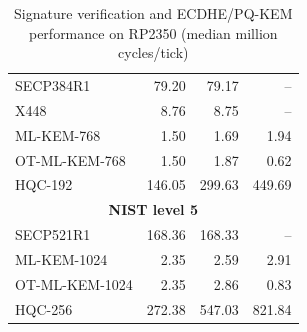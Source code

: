 \documentclass[letterpaper,12pt,titlepage,oneside,final]{book}
\begin{document}
\begin{table}[ht]
\begin{tabular}[t]{lrrr}
    \midrule
        SECP384R1 & 79.20 & 79.17 & -- \\
        X448 & 8.76 & 8.75 & -- \\
        ML-KEM-768 & 1.50 & 1.69 & 1.94 \\
        OT-ML-KEM-768 & 1.50 & 1.87 & 0.62 \\
        HQC-192 & 146.05 & 299.63 & 449.69 \\
    \midrule
        \multicolumn{4}{c}{\bf NIST level 5} \\
    \midrule
        SECP521R1 & 168.36 & 168.33 & -- \\
        ML-KEM-1024 & 2.35 & 2.59 & 2.91 \\
        OT-ML-KEM-1024 & 2.35 & 2.86 & 0.83 \\
        HQC-256 & 272.38 & 547.03 & 821.84 \\
    \bottomrule
    \end{tabular}
    \caption{Signature verification and ECDHE/PQ-KEM performance on RP2350 (median million cycles/tick)}
    \label{tab:crypto-primitives-rp2350}
\end{table}
\end{document}
